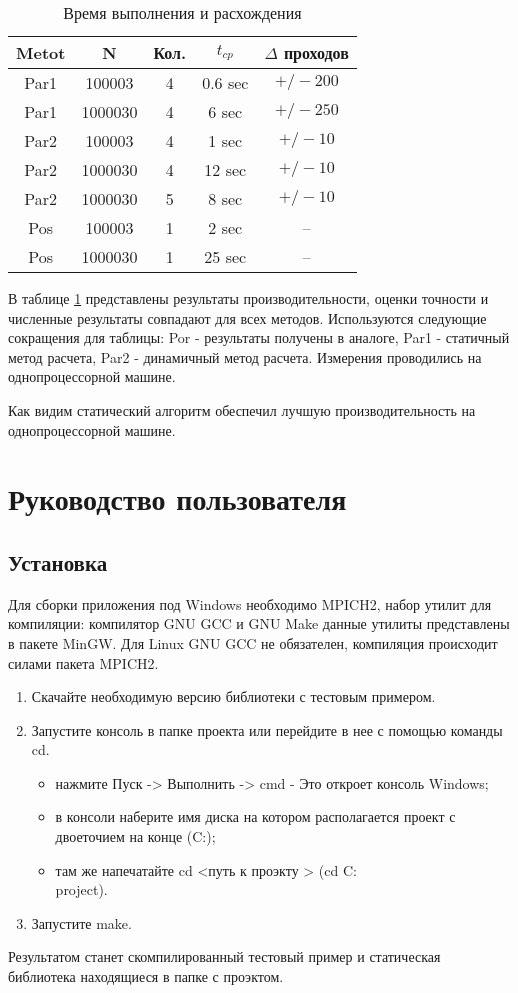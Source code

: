 \begin{table}[hp]
	\caption{Время выполнения и расхождения}
	\label{sample_table}
\begin{tabular}{|c|c|c|c|c|}
\hline 
Metot & N & Кол.& $t_{cp}$ & $\Delta$ проходов \\ \hline
Par1 & 100003 & 4 & 0.6 sec & $+/- 200 $ \\ \hline
Par1 & 1000030 & 4& 6 sec & $+/- 250 $ \\ \hline
Par2 & 100003 & 4 &1 sec & $+/- 10 $ \\ \hline
Par2 & 1000030 & 4 & 12 sec & $+/- 10 $ \\ \hline
Par2 & 1000030 & 5 & 8 sec & $+/- 10 $ \\ \hline
Pos & 100003 & 1 &2 sec & -- \\ \hline
Pos & 1000030 & 1 &25 sec & -- \\ \hline
\end{tabular}
\end{table}

В таблице \ref{sample_table} представлены результаты производительности, оценки точности и численные результаты совпадают для всех методов. Используются следующие сокращения для таблицы: Por - результаты получены в аналоге, Par1 - статичный метод расчета, Par2 - динамичный метод расчета. Измерения проводились на однопроцессорной машине.

Как видим статический алгоритм обеспечил лучшую производительность на однопроцессорной машине.
\chapter{Руководство пользователя}
\section{Установка}
Для сборки приложения под Windows необходимо MPICH2, набор утилит для компиляции: компилятор GNU GCC и GNU Make данные утилиты представлены в пакете MinGW. Для Linux GNU GCC не обязателен, компиляция происходит силами пакета MPICH2.
\begin{enumerate}
	\item Скачайте необходимую версию библиотеки с тестовым примером.
	\item Запустите консоль в папке проекта или перейдите в нее с помощью команды cd.
	\begin{itemize}
		\item нажмите Пуск -> Выполнить -> cmd - Это откроет консоль Windows;
		\item в консоли наберите имя диска на котором располагается проект с двоеточием на конце (C:);
		\item там же напечатайте cd <путь к проэкту > (cd C:\\project).
	\end{itemize}
	\item Запустите make.
\end{enumerate}
Результатом станет скомпилированный тестовый пример и статическая библиотека находящиеся в папке с проэктом.

